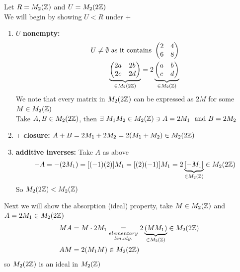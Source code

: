 \begin{example}
Let $R=M_2({\mathbb{ Z}})$ and $U=M_2(2{\mathbb{ Z}})$ \\
We will begin by showing $U<R$ under $+$
\begin{enumerate}[label=\roman*)]
    \item $U$ \textbf{nonempty: }\begin{align}
    U\neq \emptyset \text{ as it contains } \begin{pmatrix}
        2&4\\6&8
    \end{pmatrix} \nonumber \\
    \underbrace{\begin{pmatrix}
        2a & 2b \\ 2c & 2d
    \end{pmatrix}}_{\in M_2(2{\mathbb{ Z}})} = 2 \underbrace{\begin{pmatrix}
        a&b \\ c& d
    \end{pmatrix}}_{\in M_2({\mathbb{ Z}})} \nonumber
\end{align}
We note that every matrix in $M_2(2{\mathbb{ Z}})$ can be expressed as $2M$ for some $M \in M_2({\mathbb{ Z}})$ \steezybreak\\
Take $A,B \in M_2(2{\mathbb{ Z}})$, then $\exists \ M_1 M_2 \in M_2({\mathbb{ Z}}) \ni A=2M_1 \ \text{ and } B=2M_2$
\item + \textbf{closure:} $A+B=2M_1+2M_2 = 2(M_1+M_2) \in M_2(2{\mathbb{ Z}})$
\item \textbf{additive inverses:} Take $A$ as above
\begin{align}
    -A= -(2M_1)=[(-1)(2)]M_1=[(2)(-1)]M_1 = 2\underbrace{[-M_1]}_{\in M_2({\mathbb{ Z}})} \in M_2(2{\mathbb{ Z}}) \nonumber
\end{align}
So $M_2(2{\mathbb{ Z}})<M_2({\mathbb{ Z}})$
\end{enumerate}
Next we will show the absorption (ideal) property, take $M\in M_2({\mathbb{ Z}})$ and $A=2M_1\in M_2(2{\mathbb{ Z}})$
\begin{align}
    MA &= M\cdot 2M_1 \underset{\substack{elementary \\lin. alg.}}{=} 2\underbrace{(MM_1)}_{\in M_2({\mathbb{ Z}})} \in M_2(2{\mathbb{ Z}}) \nonumber \\
    AM &= 2(M_1M) \in M_2(2{\mathbb{ Z}}) \nonumber
\end{align}
so $M_2(2{\mathbb{ Z}})$ is an ideal in $M_2({\mathbb{ Z}})$
\end{example}

